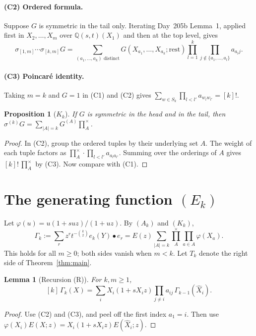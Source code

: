 \documentclass[11pt]{amsart}
\newtheorem{lemma}[theorem]{Lemma}
\newtheorem{proposition}[theorem]{Proposition}
\theoremstyle{remark}
\newcommand{\hX}{\widehat{X}}
\newcommand{\cross}{\textstyle\prod^{\times}}
\begin{document}
\paragraph{(C2) Ordered formula.} Suppose $G$ is symmetric in the tail only. Iterating Day~205b Lemma~1, applied first in $X_2,\dots,X_m$ over $\mathbb Q(s,t)(X_1)$ and then at the top level, gives
\[
\sigma_{[1,m]}\cdots\sigma_{[k,m]}G=\sum_{(a_1,\dots,a_k)\text{ distinct}}G(X_{a_1},\dots,X_{a_k};\text{rest})\prod_{l=1}^k\prod_{j\notin\{a_1,\dots,a_l\}}a_{a_lj}.
\]

\paragraph{(C3) Poincar\'e identity.} Taking $m=k$ and $G=1$ in (C1) and (C2) gives $\sum_{w\in S_k}\prod_{l<l'}a_{w_lw_{l'}}=[k]!$.

\begin{proposition}[$K_k$]
If $G$ is symmetric in the head and in the tail, then $\sigma^{(k)}G=\sum_{|A|=k}G^{(A)}\cross_A$.
\end{proposition}

\begin{proof}
In (C2), group the ordered tuples by their underlying set $A$. The weight of each tuple factors as $\cross_A\cdot\prod_{l<l'}a_{a_la_{l'}}$. Summing over the orderings of $A$ gives $[k]!\,\cross_A$ by (C3). Now compare with (C1).
\end{proof}

\section{The generating function $(E_k)$}

Let $\varphi(u)=u(1+suz)/(1+uz)$. By $(A_k)$ and $(K_k)$,
\[
\Gamma_k:=\sum_rz^rt^{-\binom k2}e_k(Y)\bullet e_r=E(z)\sum_{|A|=k}\cross_A\prod_{a\in A}\varphi(X_a).
\]
This holds for all $m\ge0$; both sides vanish when $m<k$. Let $T_k$ denote the right side of Theorem~\ref{thm:main}.

\begin{lemma}[Recursion (R)]
For $k,m\ge1$,
\[
[k]\,\Gamma_k(X)=\sum_iX_i(1+sX_iz)\prod_{j\ne i}a_{ij}\,\Gamma_{k-1}(\hX_i).
\]
\end{lemma}

\begin{proof}
Use (C2) and (C3), and peel off the first index $a_1=i$. Then use $\varphi(X_i)E(X;z)=X_i(1+sX_iz)E(\hX_i;z)$.
\end{proof}
\end{document}

